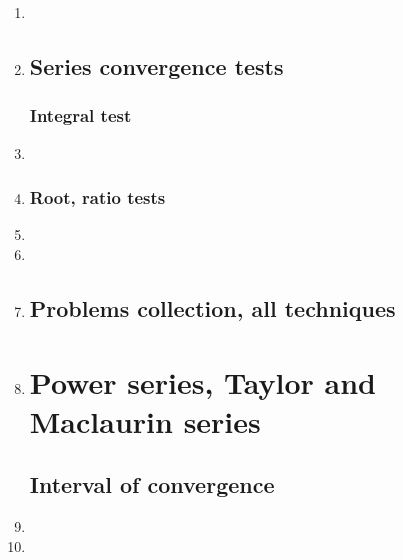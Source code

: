 \documentclass{article}
\begin{document}
\begin{enumerate}
\item 
\item 


\subsection{Series convergence tests}
\subsubsection{Integral test}
\item 
\item 
\subsubsection{Root, ratio tests}
\item 
\item 

\item 
\subsection{Problems collection, all techniques}
\item 

\section{Power series, Taylor and Maclaurin series}
\subsection{Interval of convergence}
\item 
\item 

\end{enumerate}
\end{document}
